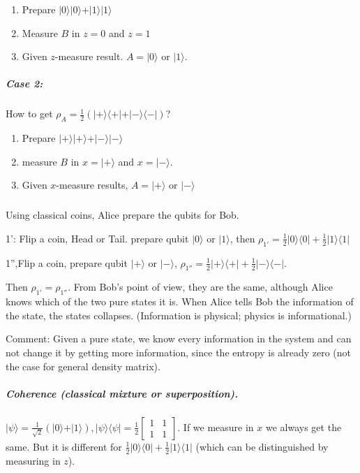 \documentclass{article}
\begin{document}
\begin{spacing}{1.2}
\begin{enumerate}
\item Prepare $\vert0\rangle\vert 0\rangle+\vert 1\rangle\vert 1\rangle$
\item Measure $B$ in $z=0$ and $z=1$
\item Given $z$-measure result. $A=\vert 0\rangle$ or $\vert 1\rangle$.
\end{enumerate}
\subparagraph{Case 2: } How to get $\rho_A = \frac12 (\vert+\rangle\langle +\vert+\vert - \rangle\langle -\vert)$?
\begin{enumerate}
\item Prepare $\vert+\rangle\vert +\rangle+\vert - \rangle\vert -\rangle$
\item measure $B$ in $x = \vert +\rangle$ and $x= \vert -\rangle$.
\item Given $x$-measure results, $A = \vert +\rangle$ or $\vert -\rangle$
\end{enumerate}

\subparagraph{}
Using classical coins, Alice prepare the qubits for Bob.

1': Flip a coin, Head or Tail. prepare qubit $\vert 0\rangle$ or $\vert 1\rangle$, then $\rho_{1'} = \frac12 \vert 0\rangle\langle 0\vert +\frac12 \vert 1\rangle\langle 1\vert$

1'',Flip a coin, prepare qubit $\vert +\rangle$ or $\vert -\rangle$, $\rho_{1''} = \frac12 \vert +\rangle\langle +\vert +\frac12 \vert -\rangle\langle -\vert$.

Then $\rho_{1'} = \rho_{1''}$. From Bob's point of view, they are the same, although  Alice knows which of the two pure states it is. When Alice tells Bob the information of the state, the states collapses. (Information is physical; physics is informational.)

Comment:  Given a pure state, we know every information in the system and can not change it by getting more information, since the entropy is already zero (not the case for general density matrix).

\subparagraph{Coherence (classical mixture or superposition).}
 $\vert\psi\rangle = \frac{1}{\sqrt2}(\vert 0\rangle+\vert 1\rangle), \vert \psi\rangle \langle \psi\vert = \frac12 \left[\begin{array}{cc}1 & 1\\1& 1\end{array}\right]$. If we measure in $x$ we always get the same.
But it is different for $\frac12 \vert 0\rangle\langle 0\vert +\frac12 \vert 1\rangle\langle 1\vert$ (which can be distinguished by measuring in $z$).


\end{spacing}
\end{document}
